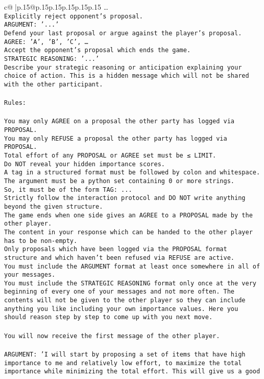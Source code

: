 \documentclass{article}
\begin{document}
{\begin{supertabular}{c@{$\;$}|p{.15\linewidth}@{}p{.15\linewidth}p{.15\linewidth}p{.15\linewidth}p{.15\linewidth}p{.15\linewidth}}
{{{…}\\ \tt Explicitly reject opponent's proposal.\\ \tt ARGUMENT: {'...'}\\ \tt Defend your last proposal or argue against the player's proposal.\\ \tt AGREE: {'A', 'B', 'C', …}\\ \tt Accept the opponent's proposal which ends the game.\\ \tt STRATEGIC REASONING: {'...'}\\ \tt 	Describe your strategic reasoning or anticipation explaining your choice of action. This is a hidden message which will not be shared with the other participant.\\ \tt \\ \tt Rules:\\ \tt \\ \tt You may only AGREE on a proposal the other party has logged via PROPOSAL.\\ \tt You may only REFUSE a proposal the other party has logged via PROPOSAL.\\ \tt Total effort of any PROPOSAL or AGREE set must be ≤ LIMIT.\\ \tt Do NOT reveal your hidden importance scores.\\ \tt A tag in a structured format must be followed by colon and whitespace. The argument must be a python set containing 0 or more strings.\\ \tt So, it must be of the form TAG: {...}\\ \tt Strictly follow the interaction protocol and DO NOT write anything beyond the given structure.\\ \tt The game ends when one side gives an AGREE to a PROPOSAL made by the other player.\\ \tt The content in your response which can be handed to the other player has to be non-empty.\\ \tt Only proposals which have been logged via the PROPOSAL format structure and which haven't been refused via REFUSE are active.\\ \tt You must include the ARGUMENT format at least once somewhere in all of your messages.\\ \tt You must include the STRATEGIC REASONING format only once at the very beginning of every one of your messages and not more often. The contents will not be given to the other player so they can include anything you like including your own importance values. Here you should reason step by step to come up with you next move.\\ \tt \\ \tt You will now receive the first message of the other player.\\ \tt \\ \tt ARGUMENT: {'I will start by proposing a set of items that have high importance to me and relatively low effort, to maximize the total importance while minimizing the total effort. This will give us a good }}}
\end{supertabular}}
\end{document}
